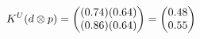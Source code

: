 \documentclass[preview]{standalone}
\begin{document}
\begin{align*}
\special{dvisvgm:raw <g id='unique000'>}K^U(d \otimes p) = \begin{pmatrix} (0.74)(0.64) \\ (0.86)(0.64) \end{pmatrix} = \begin{pmatrix} 0.48 \\ 0.55 \end{pmatrix}\special{dvisvgm:raw </g>}
\end{align*}
\end{document}
